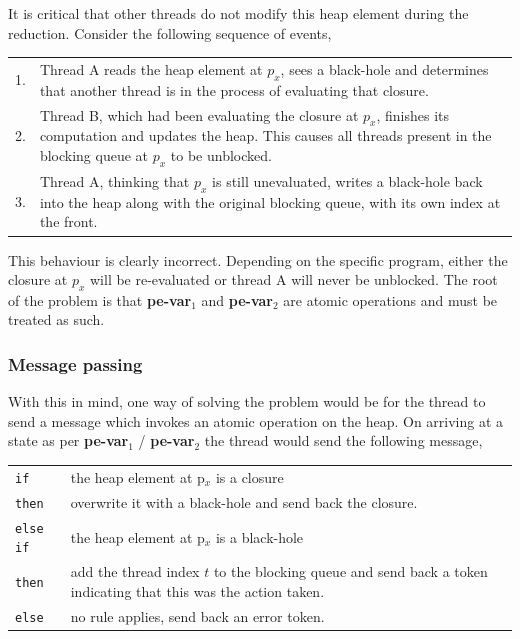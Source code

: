\documentclass{llncs}
\begin{document}
It is critical that other threads do not modify this heap element during the reduction. Consider the following sequence of events, 

\medskip
\begin{tabular}{rp{10.5cm}}

1. & Thread A reads the heap element at $p_x$, sees a black-hole and determines that another thread is in the process of evaluating that closure.\smallskip \\

2. & Thread B, which had been evaluating the closure at $p_x$, finishes its computation and updates the heap. This causes all threads present in the blocking queue at $p_x$ to be unblocked.\smallskip \\

3. & Thread A, thinking that $p_x$ is still unevaluated, writes a black-hole back into the heap along with the original blocking queue, with its own index at the front.\smallskip \\
\end{tabular}

\noindent
This behaviour is clearly incorrect. Depending on the specific program, either the closure at $p_x$ will be re-evaluated or thread A will never be unblocked. The root of the problem is that \textbf{pe-var$_1$} and \textbf{pe-var$_2$} are atomic operations and must be treated as such. 

\subsubsection{Message passing}
With this in mind, one way of solving the problem would be for the thread to send a message which invokes an atomic operation on the heap. On arriving at a state as per \textbf{pe-var$_1$} / \textbf{pe-var$_2$} the thread would send the following message,  

\medskip
\begin{tabular}{p{1.5cm}p{9cm}}
\texttt{if}   	 & the heap element at p$_x$ is a closure \\
\texttt{then} 	 & overwrite it with a black-hole and send back the closure.\smallskip\\
\texttt{else if} & the heap element at p$_x$ is a black-hole \\
\texttt{then}    & add the thread index $t$ to the blocking queue and send back a
                   token indicating that this was the action taken.\smallskip\\
\texttt{else}    & no rule applies, send back an error token. \\
\end{tabular}
\medskip
\end{document}
